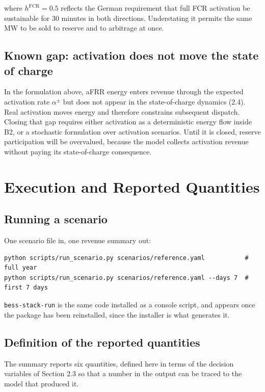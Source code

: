 \documentclass[11pt,a4paper]{article}
\numberwithin{equation}{section}
\begin{document}
where $h^{\text{FCR}} = 0.5$ reflects the German requirement that full FCR
activation be sustainable for 30 minutes in both directions. Understating it
permits the same MW to be sold to reserve and to arbitrage at once.

\subsection{Known gap: activation does not move the state of charge}

In the formulation above, aFRR energy enters revenue through the expected
activation rate $\alpha^{\pm}$ but does not appear in the state-of-charge
dynamics (2.4). Real activation moves energy and therefore constrains subsequent
dispatch. Closing that gap requires either activation as a deterministic energy
flow inside B2, or a stochastic formulation over activation scenarios. Until it
is closed, reserve participation will be overvalued, because the model collects
activation revenue without paying its state-of-charge consequence.

\section{Execution and Reported Quantities}

\subsection{Running a scenario}

One scenario file in, one revenue summary out:

\begin{verbatim}
python scripts/run_scenario.py scenarios/reference.yaml           # full year
python scripts/run_scenario.py scenarios/reference.yaml --days 7  # first 7 days
\end{verbatim}

\texttt{bess-stack-run} is the same code installed as a console script, and
appears once the package has been reinstalled, since the installer is what
generates it.

\subsection{Definition of the reported quantities}

The summary reports six quantities, defined here in terms of the decision
variables of Section 2.3 so that a number in the output can be traced to the
model that produced it.
\end{document}
